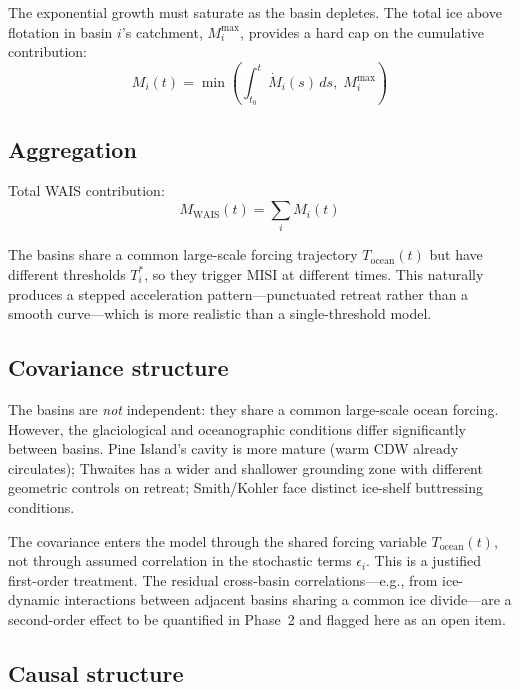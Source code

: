 \documentclass[11pt]{article}
\newcommand{\WAIS}{\text{WAIS}}
\begin{document}
The exponential growth must saturate as the basin depletes.  The total ice above flotation in basin $i$'s catchment, $M^{\max}_i$, provides a hard cap on the cumulative contribution:
\begin{equation}
  M_i(t) = \min\!\left(\int_{t_0}^{t} \dot{M}_i(s)\, ds,\; M^{\max}_i\right)
  \label{eq:basin_cap}
\end{equation}

\subsection{Aggregation}

Total WAIS contribution:
\begin{equation}
  M_{\WAIS}(t) = \sum_{i} M_i(t)
  \label{eq:wais_aggregate}
\end{equation}

The basins share a common large-scale forcing trajectory $T_{\text{ocean}}(t)$ but have different thresholds $T^*_i$, so they trigger MISI at different times.  This naturally produces a stepped acceleration pattern---punctuated retreat rather than a smooth curve---which is more realistic than a single-threshold model.

\subsection{Covariance structure}

The basins are \emph{not} independent: they share a common large-scale ocean forcing.  However, the glaciological and oceanographic conditions differ significantly between basins.  Pine Island's cavity is more mature (warm CDW already circulates); Thwaites has a wider and shallower grounding zone with different geometric controls on retreat; Smith/Kohler face distinct ice-shelf buttressing conditions.

The covariance enters the model through the shared forcing variable $T_{\text{ocean}}(t)$, not through assumed correlation in the stochastic terms $\epsilon_i$.  This is a justified first-order treatment.  The residual cross-basin correlations---e.g., from ice-dynamic interactions between adjacent basins sharing a common ice divide---are a second-order effect to be quantified in Phase~2 and flagged here as an open item.


\subsection{Causal structure}
\end{document}
